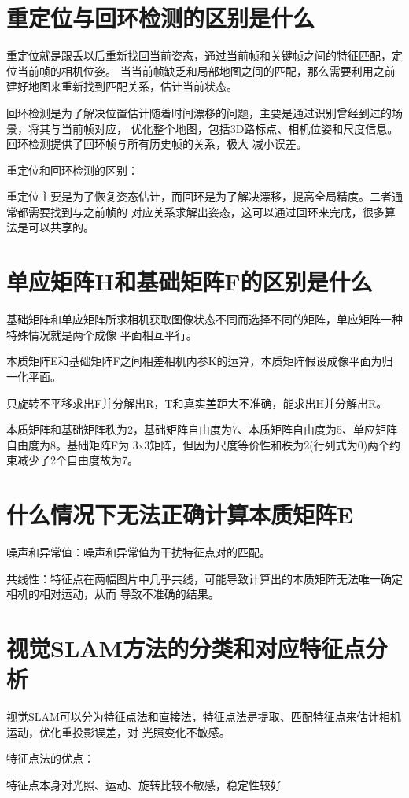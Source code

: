 \documentclass[10pt]{article}
\begin{document}
\tableofcontents
{}
\section{重定位与回环检测的区别是什么}
重定位就是跟丢以后重新找回当前姿态，通过当前帧和关键帧之间的特征匹配，定位当前帧的相机位姿。
当当前帧缺乏和局部地图之间的匹配，那么需要利用之前建好地图来重新找到匹配关系，估计当前状态。

回环检测是为了解决位置估计随着时间漂移的问题，主要是通过识别曾经到过的场景，将其与当前帧对应，
优化整个地图，包括3D路标点、相机位姿和尺度信息。回环检测提供了回环帧与所有历史帧的关系，极大
减小误差。

重定位和回环检测的区别：

重定位主要是为了恢复姿态估计，而回环是为了解决漂移，提高全局精度。二者通常都需要找到与之前帧的
对应关系求解出姿态，这可以通过回环来完成，很多算法是可以共享的。
\section{单应矩阵H和基础矩阵F的区别是什么}
基础矩阵和单应矩阵所求相机获取图像状态不同而选择不同的矩阵，单应矩阵一种特殊情况就是两个成像
平面相互平行。

本质矩阵E和基础矩阵F之间相差相机内参K的运算，本质矩阵假设成像平面为归一化平面。

只旋转不平移求出F并分解出R，T和真实差距大不准确，能求出H并分解出R。

本质矩阵和基础矩阵秩为2，基础矩阵自由度为7、本质矩阵自由度为5、单应矩阵自由度为8。基础矩阵F为
3x3矩阵，但因为尺度等价性和秩为2(行列式为0)两个约束减少了2个自由度故为7。
\section{什么情况下无法正确计算本质矩阵E}
噪声和异常值：噪声和异常值为干扰特征点对的匹配。

共线性：特征点在两幅图片中几乎共线，可能导致计算出的本质矩阵无法唯一确定相机的相对运动，从而
导致不准确的结果。

\section{视觉SLAM方法的分类和对应特征点分析}
视觉SLAM可以分为特征点法和直接法，特征点法是提取、匹配特征点来估计相机运动，优化重投影误差，对
光照变化不敏感。

\noindent 特征点法的优点：

特征点本身对光照、运动、旋转比较不敏感，稳定性较好
\end{document}
